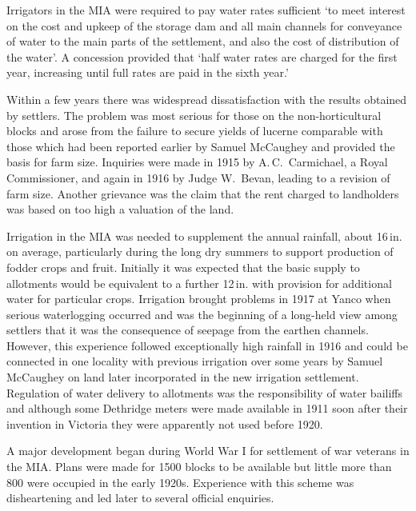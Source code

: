 Irrigators in the MIA were required to pay water rates sufficient `to
meet interest on the cost and upkeep of the storage dam and all main
channels for conveyance of water to the main parts of the settlement,
and also the cost of distribution of the water'. A concession provided
that `half water rates are charged for the first year, increasing
until full rates are paid in the sixth year.'

Within a few years there was widespread dissatisfaction with the
results obtained by settlers.  The problem was most serious for those
on the non-horticultural blocks and arose from the failure to secure
yields of lucerne comparable with those which had been reported
earlier by Samuel McCaughey and provided the basis for farm size.
Inquiries were made in 1915 by A.\,C.~Carmichael, a Royal
Commissioner, and again in 1916 by Judge W.~Bevan, leading to a
revision of farm size.  Another grievance was the claim that the rent
charged to landholders was based on too high a valuation of the
land.

Irrigation in the MIA was needed to supplement the annual rainfall,
about 16\,in. on average, particularly during the long dry summers to
support production of fodder crops and fruit.  Initially it was
expected that the basic supply to allotments would be equivalent to a
further 12\,in. with provision for additional water for particular
crops. Irrigation brought problems in 1917 at Yanco when serious
waterlogging occurred and was the beginning of a long-held view among
settlers that it was the consequence of seepage from the earthen
channels.  However, this experience followed exceptionally high
rainfall in 1916 and could be connected in one locality with previous
irrigation over some years by Samuel McCaughey on land later
incorporated in the new irrigation settlement.  Regulation of water
delivery to allotments was the responsibility of water bailiffs and
although some Dethridge meters were made available in 1911 soon after
their invention in Victoria they were apparently not used before
1920.

A major development began during World War I for settlement of war
veterans in the MIA.  Plans were made for 1500 blocks to be available
but little more than 800 were occupied in the early 1920s.  Experience
with this scheme was disheartening and led later to several official
enquiries.

